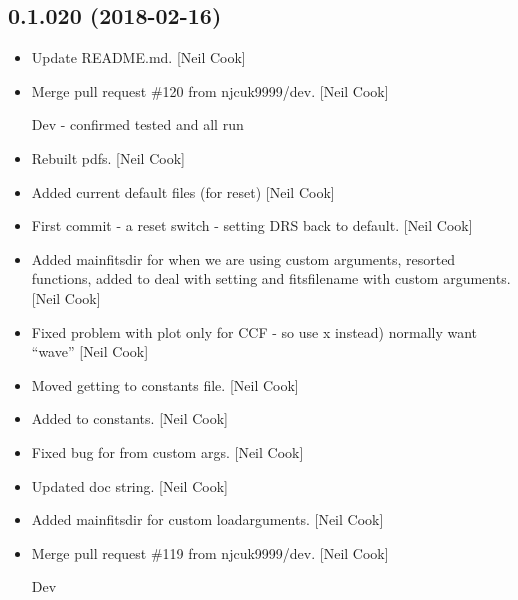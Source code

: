\documentclass[a4paper,10pt,english]{report}
\begin{document}
\subsection{0.1.020 (2018-02-16)}
\label{\detokenize{misc/changelog:id484}}\begin{itemize}
\item {} 
Update README.md. {[}Neil Cook{]}

\item {} 
Merge pull request \#120 from njcuk9999/dev. {[}Neil Cook{]}

Dev - confirmed tested and all run

\item {} 
Rebuilt pdfs. {[}Neil Cook{]}

\item {} 
Added current default files (for reset) {[}Neil Cook{]}

\item {} 
First commit - a reset switch - setting DRS back to default. {[}Neil
Cook{]}

\item {} 
Added mainfitsdir for when we are using custom arguments, resorted
functions, added  to deal with
setting  and fitsfilename with custom arguments. {[}Neil
Cook{]}

\item {} 
Fixed problem with plot  only for CCF - so use x instead)
normally want “wave” {[}Neil Cook{]}

\item {} 
Moved  getting to constants file. {[}Neil Cook{]}

\item {} 
Added  to constants. {[}Neil Cook{]}

\item {} 
Fixed bug for  from custom args. {[}Neil Cook{]}

\item {} 
Updated doc string. {[}Neil Cook{]}

\item {} 
Added mainfitsdir for custom loadarguments. {[}Neil Cook{]}

\item {} 
Merge pull request \#119 from njcuk9999/dev. {[}Neil Cook{]}

Dev


\end{itemize}
\end{document}
